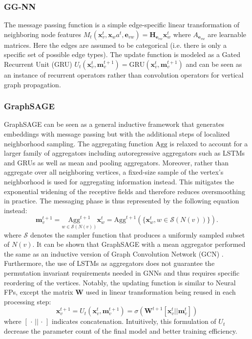 \subsubsection{GG-NN \citep{liGatedGraphSequence2017}} The message passing
function is a simple edge-specific linear transformation of neighboring node
features $M_t(\mathbf{x}_v^t, \mathbf{x}_wa^t, \mathbf{e}_{vw}) =
\mathbf{H}_{\mathbf{e}_{vw}} \mathbf{x}_w^t$ where $A_{\mathbf{e}_{vw}}$ are
learnable matrices. Here the edges are assumed to be categorical (i.e. there is
only a specific set of possible edge types). The update function is modeled as a
Gated Recurrent Unit (GRU) \citep{chungEmpiricalEvaluationGated2014}
$U_t(\mathbf{x}_{v}^t, \mathbf{m}_{v}^{t+1}) = \text{GRU}(\mathbf{x}_{v}^t,
\mathbf{m}_{v}^{t+1})$ and can be seen as an instance of recurrent operators
rather than convolution operators for vertical graph propagation.

\subsubsection{GraphSAGE \citep{hamiltonInductiveRepresentationLearning2017}}
GraphSAGE can be seen as a general inductive framework that generates embeddings
with message passing but with the additional steps of localized neighborhood
sampling. The aggregating function $\text{Agg}$ is relaxed to account for a
larger family of aggregators including autoregressive aggregators such as LSTMs
and GRUs as well as mean and pooling aggregators. Moreover, rather than
aggregate over all neighboring vertices, a fixed-size sample of the vertex's
neighborhood is used for aggregating information instead. This mitigates the
exponential widening of the receptive fields and therefore reduces oversmoothing
in practice. The messaging phase is thus represented by the following equation
instead: $$ \mathbf{m}_{v}^{t+1} = \underset{w \in
\mathcal{S}(N(v))}{\text{Agg}^{t+1}} \mathbf{x}_{w}^t = \text{Agg}^{t+1}(\{
  \mathbf{x}_w^t, w \in \mathcal{S}(N(v))\}) .$$ where $\mathcal{S}$ denotes the
sampler function that produces a uniformly sampled subset of $N(v)$. It can be
shown that GraphSAGE with a mean aggregator performed the same as an inductive
version of Graph Convolution Network (GCN)
\citep{kipfSemiSupervisedClassificationGraph2017}. Furthermore, the use of LSTMs
as aggregators does not guarantee the permutation invariant requirements needed
in GNNs and thus requires specific reordering of the vertices. Notably, the
updating function is similar to Neural FPs, except the matrix $\mathbf{W}$ used
in linear transformation being reused in each processing step:
$$
\mathbf{x}_{v}^{t+1}= U_t(\mathbf{x}_{v}^{t}, \mathbf{m}_{v}^{t+1}) = \sigma(\mathbf{W}^{t+1}[\mathbf{x}_{v}^t || \mathbf{m}_{v}^t])
$$
where $[\,\cdot\, ||\, \cdot\,]$ indicates concatenation. Intuitively, this
formulation of $U_t$ decrease the parameter count of the final model and better
training efficiency.



